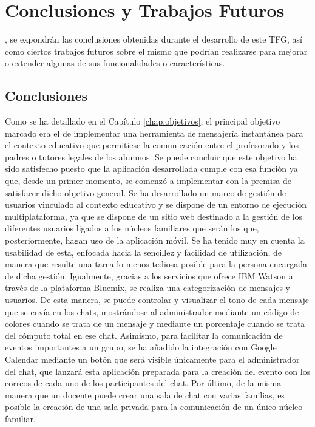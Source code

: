 \chapter{Conclusiones y Trabajos Futuros}
\label{chap:conclusiones}

, se expondrán las conclusiones obtenidas durante el desarrollo de este \acs{TFG}, así como ciertos trabajos futuros sobre el mismo que podrían realizarse para mejorar o extender algunas de sus funcionalidades o características.

\section{Conclusiones}
Como se ha detallado en el Capítulo \ref{chap:objetivos}, el principal objetivo marcado era el de implementar una herramienta de mensajería instantánea para el contexto educativo que permitiese la comunicación entre el profesorado y los padres o tutores legales de los alumnos. Se puede concluir que este objetivo ha sido satisfecho puesto que la aplicación desarrollada cumple con esa función ya que, desde un primer momento, se comenzó a implementar con la premisa de satisfacer dicho objetivo general. Se ha desarrollado un marco de gestión de usuarios vinculado al contexto educativo y se dispone de un entorno de ejecución multiplataforma, ya que se dispone de un sitio web destinado a la gestión de los diferentes usuarios ligados a los núcleos familiares que serán los que, posteriormente, hagan uso de la aplicación móvil. Se ha tenido muy en cuenta la usabilidad de esta, enfocada hacia la sencillez y facilidad de utilización, de manera que resulte una tarea lo menos tediosa posible para la persona encargada de dicha gestión. Igualmente, gracias a los servicios que ofrece IBM Watson a través de la plataforma Bluemix, se realiza una categorización de mensajes y usuarios. De esta manera, se puede controlar y visualizar el tono de cada mensaje que se envía en los chats, mostrándose al administrador mediante un código de colores cuando se trata de un mensaje y mediante un porcentaje cuando se trata del cómputo total en ese chat. Asimismo, para facilitar la comunicación de eventos importantes a un grupo, se ha añadido la integración con Google Calendar mediante un botón que será visible únicamente para el administrador del chat, que lanzará esta aplicación preparada para la creación del evento con los correos de cada uno de los participantes del chat. Por último, de la misma manera que un docente puede crear una sala de chat con varias familias, es posible la creación de una sala privada para la comunicación de un único núcleo familiar.


